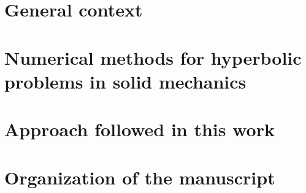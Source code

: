
\section{General context}



\section{Numerical methods for hyperbolic problems in solid mechanics}



\section{Approach followed in this work}


\section{Organization of the manuscript}


